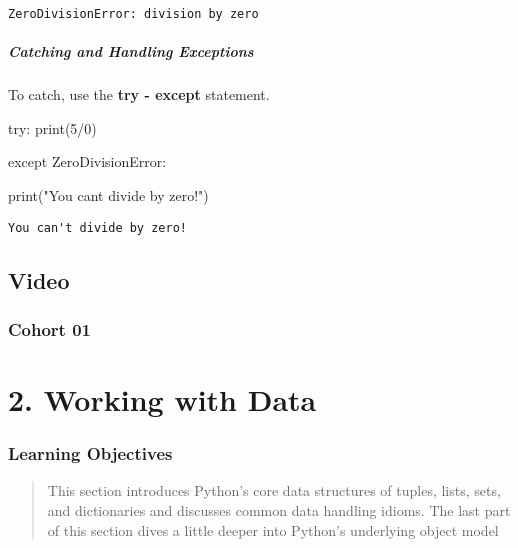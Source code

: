\documentclass[
  letterpaper,
  DIV=11,
  numbers=noendperiod]{scrreprt}
\newenvironment{Shaded}{\begin{snugshade}}{\end{snugshade}}
\newcommand{\BuiltInTok}[1]{\textcolor[rgb]{0.00,0.46,0.62}{#1}}
\newcommand{\ControlFlowTok}[1]{\textcolor[rgb]{0.00,0.46,0.62}{#1}}
\newcommand{\DecValTok}[1]{\textcolor[rgb]{0.68,0.00,0.00}{#1}}
\newcommand{\NormalTok}[1]{\textcolor[rgb]{0.00,0.46,0.62}{#1}}
\newcommand{\OperatorTok}[1]{\textcolor[rgb]{0.37,0.37,0.37}{#1}}
\newcommand{\PreprocessorTok}[1]{\textcolor[rgb]{0.68,0.00,0.00}{#1}}
\newcommand{\StringTok}[1]{\textcolor[rgb]{0.13,0.47,0.30}{#1}}
\begin{document}
\begin{verbatim}
ZeroDivisionError: division by zero
\end{verbatim}

\hypertarget{catching-and-handling-exceptions}{%
\subsubsection{Catching and Handling
Exceptions}\label{catching-and-handling-exceptions}}

To catch, use the \textbf{try - except} statement.

\begin{Shaded}
\begin{Highlighting}[]
\ControlFlowTok{try}\NormalTok{: }
    \BuiltInTok{print}\NormalTok{(}\DecValTok{5}\OperatorTok{/}\DecValTok{0}\NormalTok{) }
    
\ControlFlowTok{except} \PreprocessorTok{ZeroDivisionError}\NormalTok{: }
    
    \BuiltInTok{print}\NormalTok{(}\StringTok{"You can\textquotesingle{}t divide by zero!"}\NormalTok{)}
\end{Highlighting}
\end{Shaded}

\begin{verbatim}
You can't divide by zero!
\end{verbatim}

\hypertarget{video}{%
\chapter{Video}\label{video}}

\hypertarget{cohort-01}{%
\section{Cohort 01}\label{cohort-01}}

\part{2. Working with Data}

\hypertarget{learning-objectives-1}{%
\section*{Learning Objectives}\label{learning-objectives-1}}

\begin{quote}
This section introduces Python's core data structures of tuples, lists,
sets, and dictionaries and discusses common data handling idioms. The
last part of this section dives a little deeper into Python's underlying
object model
\end{quote}
\end{document}

